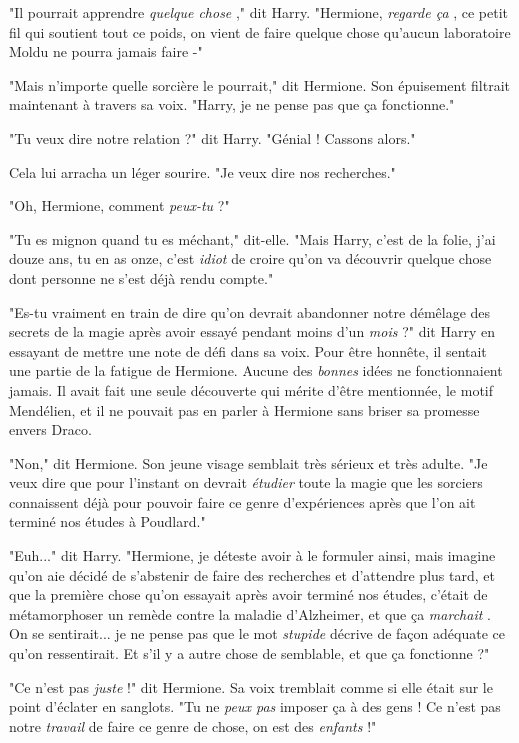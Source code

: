 "Il pourrait apprendre \emph{quelque chose} ," dit Harry. "Hermione, \emph{regarde ça} , ce petit fil qui soutient tout ce poids, on vient de faire quelque chose qu'aucun laboratoire Moldu ne pourra jamais faire -"

"Mais n'importe quelle sorcière le pourrait," dit Hermione. Son épuisement filtrait maintenant à travers sa voix. "Harry, je ne pense pas que ça fonctionne."

"Tu veux dire notre relation ?" dit Harry. "Génial ! Cassons alors."

Cela lui arracha un léger sourire. "Je veux dire nos recherches."

"Oh, Hermione, comment \emph{peux-tu } ?"

"Tu es mignon quand tu es méchant," dit-elle. "Mais Harry, c'est de la folie, j'ai douze ans, tu en as onze, c'est \emph{idiot}  de croire qu'on va découvrir quelque chose dont personne ne s'est déjà rendu compte."

"Es-tu vraiment en train de dire qu'on devrait abandonner notre démêlage des secrets de la magie après avoir essayé pendant moins d'un \emph{mois}  ?" dit Harry en essayant de mettre une note de défi dans sa voix. Pour être honnête, il sentait une partie de la fatigue de Hermione. Aucune des \emph{bonnes}  idées ne fonctionnaient jamais. Il avait fait une seule découverte qui mérite d'être mentionnée, le motif Mendélien, et il ne pouvait pas en parler à Hermione sans briser sa promesse envers Draco.

"Non," dit Hermione. Son jeune visage semblait très sérieux et très adulte. "Je veux dire que pour l'instant on devrait \emph{étudier}  toute la magie que les sorciers connaissent déjà pour pouvoir faire ce genre d'expériences après que l'on ait terminé nos études à Poudlard."

"Euh..." dit Harry. "Hermione, je déteste avoir à le formuler ainsi, mais imagine qu'on aie décidé de s'abstenir de faire des recherches et d'attendre plus tard, et que la première chose qu'on essayait après avoir terminé nos études, c'était de métamorphoser un remède contre la maladie d'Alzheimer, et que ça \emph{marchait} . On se sentirait... je ne pense pas que le mot \emph{stupide}  décrive de façon adéquate ce qu'on ressentirait. Et s'il y a autre chose de semblable, et que ça fonctionne ?"

"Ce n'est pas \emph{juste}  !" dit Hermione. Sa voix tremblait comme si elle était sur le point d'éclater en sanglots. "Tu ne \emph{peux pas}  imposer ça à des gens ! Ce n'est pas notre \emph{travail}  de faire ce genre de chose, on est des \emph{enfants}  !"

